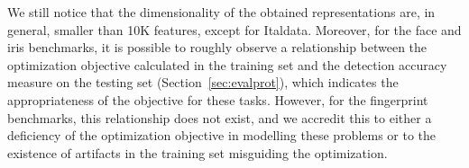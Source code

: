 We still notice that the dimensionality of the obtained representations are, in general, smaller than 10K features, except for Italdata.
Moreover, for the face and iris benchmarks, it is possible to roughly observe a relationship between the optimization objective calculated in the training set and the detection accuracy measure on the testing set (Section~\ref{sec:evalprot}), which indicates the appropriateness of the objective for these tasks. However, for the fingerprint benchmarks, this relationship does not exist, and we accredit this to either a deficiency of the optimization objective in modelling these problems or to the existence of artifacts in the training set misguiding the optimization.





